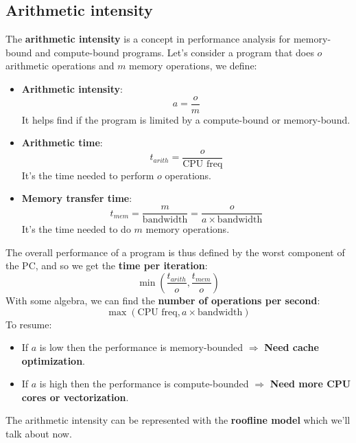 \documentclass[12pt, openany]{report}
\theoremstyle{definition}
\begin{document}
\subsection{Arithmetic intensity}
The \textbf{arithmetic intensity} is a concept in performance analysis for memory-bound and compute-bound programs.
Let's consider a program that does $o$ arithmetic operations and $m$ memory operations, we define:
\begin{itemize}
	\item \textbf{Arithmetic intensity}: 
	\begin{equation} 
		a = \frac{o}{m}
	\end{equation}
	It helps find if the program is limited by a compute-bound or memory-bound.
	\item \textbf{Arithmetic time}: 
	\begin{equation} 
		t_{arith} = \frac{o}{\text{CPU freq}}
	\end{equation}
	It's the time needed to perform $o$ operations.
	\item \textbf{Memory transfer time}:
	\begin{equation} 
		t_{mem} = \frac{m}{\text{bandwidth}} = \frac{o}{a \times \text{bandwidth}}
	\end{equation}
	It's the time needed to do $m$ memory operations. 
\end{itemize}
The overall performance of a program is thus defined by the worst component of the PC, and so we get the \textbf{time per iteration}:
\begin{equation}
	\min \left( \frac{t_{arith}}{o},\frac{t_{mem}}{o} \right)
\end{equation}
With some algebra, we can find the \textbf{number of operations per second}:
\begin{equation}
	\max \left( \text{CPU freq}, a \times \text{bandwidth} \right)
\end{equation}
To resume:
\begin{itemize}
	\item If $a$ is low then the performance is memory-bounded $\Rightarrow$ \textbf{Need cache optimization}.
	\item If $a$ is high then the performance is compute-bounded $\Rightarrow$ \textbf{Need more CPU cores or vectorization}.
\end{itemize}
The arithmetic intensity can be represented with the \textbf{roofline model} which we'll talk about now.
\newpage
\end{document}
